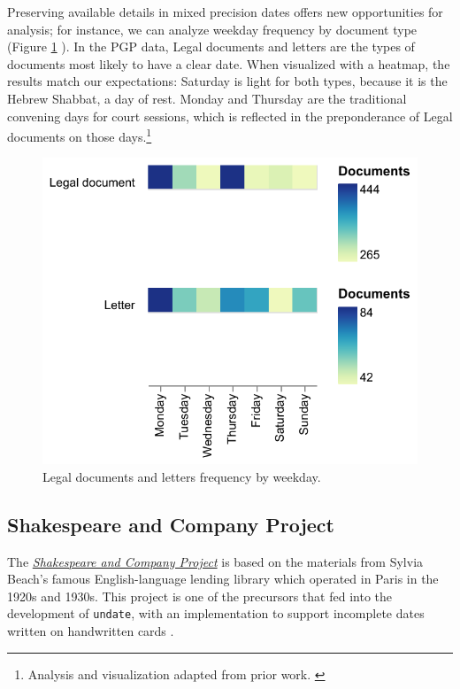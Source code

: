 \documentclass{anthology-ch}         %
\begin{document}


Preserving available details in mixed precision dates offers new opportunities for analysis; for instance, we can analyze weekday frequency by document type (Figure \ref{fig:pgp-weekday-frequency} ). In the PGP data, Legal documents and letters are the types of documents most likely to have a clear date. When visualized with a heatmap, the results match our expectations: Saturday is light for both types, because it is the Hebrew Shabbat, a day of rest. Monday and Thursday are the traditional convening days for court sessions, which is reflected in the preponderance of Legal documents on those days.\footnote{Analysis and visualization adapted from prior work. \cite{koeser_princeton_2025}}

\begin{figure}[h]
  \centering
  \includegraphics[width=0.4\linewidth]{assets/pgp_letters_legaldocs_weekday.pdf}
  \caption{Legal documents and letters frequency by weekday. }
  \label{fig:pgp-weekday-frequency}
\end{figure}


\subsection{Shakespeare and Company
Project}\label{shakespeare-and-company-project}

The \href{https://shakespeareandco.princeton.edu/}{\textit{Shakespeare and Company
Project}} is based on the materials from Sylvia Beach's famous
English-language lending library which operated in Paris in the 1920s
and 1930s. This project is one of the precursors that fed into the development of \texttt{undate}, with
an implementation to support incomplete dates written on handwritten cards \cite{kotin_shakespeare_2022, koeser_coding_2019}.
\end{document}
